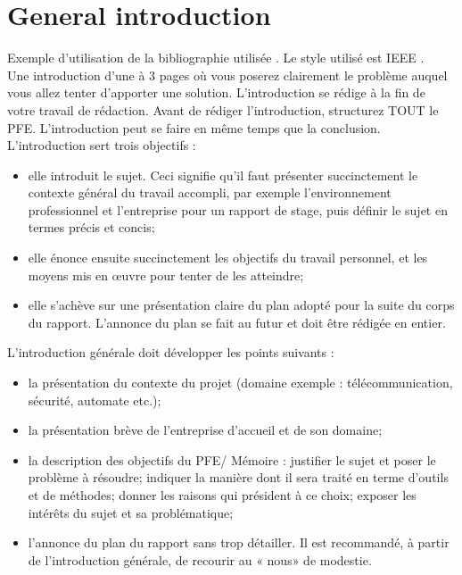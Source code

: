 \chapter*{General introduction}

Exemple d'utilisation de la bibliographie utilisée \cite{webArticle2}. Le style utilisé est IEEE \cite{webArticle1}.\\

Une introduction d’une à 3 pages où vous poserez clairement le problème auquel vous allez tenter d’apporter une solution. L’introduction se rédige à la fin de votre travail de rédaction. Avant de rédiger l’introduction, structurez TOUT le PFE. L’introduction peut se faire en même temps que la conclusion.\\

L’introduction sert trois objectifs :
\begin{itemize}
\item elle introduit le sujet. Ceci signifie qu’il faut présenter succinctement le contexte général du travail accompli, par exemple l’environnement professionnel et l’entreprise pour un rapport de stage, puis définir le sujet en termes précis et concis;
\item elle énonce ensuite succinctement les objectifs du travail personnel, et les moyens mis en œuvre pour tenter de les atteindre;
\item elle s’achève sur une présentation claire du plan adopté pour la suite du corps du rapport. L’annonce du plan se fait au futur et doit être rédigée en entier.
\end{itemize}

\null

L’introduction générale doit développer les points suivants :
\begin{itemize}
\item la présentation du contexte du projet (domaine exemple : télécommunication, sécurité, automate etc.);
\item la présentation brève de l’entreprise d’accueil et de son domaine;
\item la description des objectifs du PFE/ Mémoire : justifier le sujet et poser le problème à résoudre; indiquer  la manière dont il sera traité en terme d’outils et de méthodes; donner les raisons qui président à ce choix; exposer les intérêts du sujet et sa problématique;
\item l’annonce du plan du rapport sans trop détailler.  Il est recommandé, à partir de l’introduction générale, de recourir au « nous» de modestie.
\end{itemize}